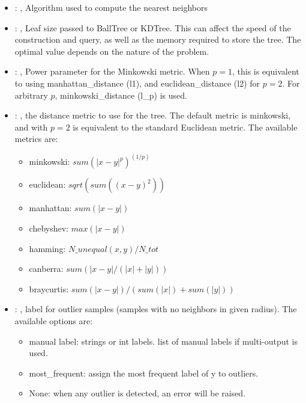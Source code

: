 \begin{itemize}
    \item {}: ,
      Algorithm used to compute the nearest neighbors

    \item {}: ,
      Leaf size passed to BallTree or KDTree. This can affect the speed of the construction
      and query, as well as the memory required to store the tree. The optimal value depends on the
      nature of the problem.

    \item {}: ,
      Power parameter for the Minkowski metric. When $p = 1$, this is equivalent to using
      manhattan\_distance (l1), and euclidean\_distance (l2) for $p = 2$. For arbitrary $p$,
      minkowski\_distance                                                  (l\_p) is used.

    \item {}: ,
      the distance metric to use for the tree. The default metric is minkowski, and with
      $p=2$ is equivalent to the standard Euclidean metric.
      The available metrics are:                                                  \begin{itemize}
      \item minkowski: $sum(|x - y|^p)^(1/p)$
      \item euclidean: $sqrt(sum((x - y)^2))$
      \item manhattan: $sum(|x - y|)$                                                    \item
      chebyshev: $max(|x - y|)$                                                    \item hamming:
      $N\_unequal(x, y) / N\_tot$                                                    \item canberra:
      $sum(|x - y| / (|x| + |y|))$                                                    \item
      braycurtis: $sum(|x - y|) / (sum(|x|) + sum(|y|))$
      \end{itemize}

    \item {}: ,
      label for outlier samples (samples with no neighbors in given radius).
      The available options are:                                                  \begin{itemize}
      \item manual label: strings or int labels. list of manual labels if multi-output is used.
      \item most\_frequent: assign the most frequent label of y to outliers.
      \item None: when any outlier is detected, an error will be raised.
      \end{itemize}
  \end{itemize}


